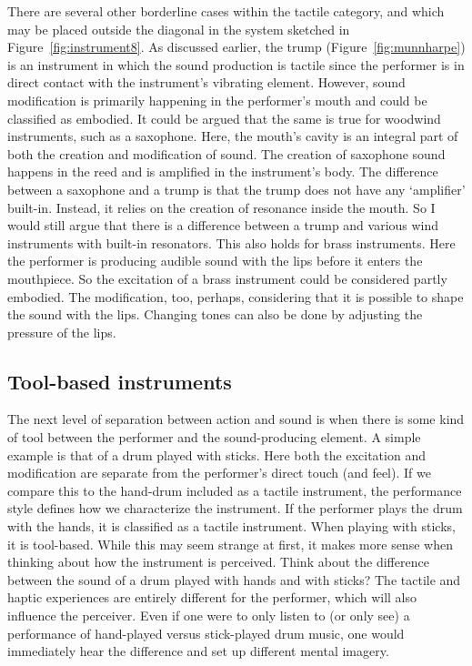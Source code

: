 There are several other borderline cases within the tactile category, and which may be placed outside the diagonal in the system sketched in Figure~\ref{fig:instrument8}. As discussed earlier, the trump (Figure~\ref{fig:munnharpe}) is an instrument in which the sound production is tactile since the performer is in direct contact with the instrument's vibrating element. However, sound modification is primarily happening in the performer's mouth and could be classified as embodied. It could be argued that the same is true for woodwind instruments, such as a saxophone. Here, the mouth's cavity is an integral part of both the creation and modification of sound. The creation of saxophone sound happens in the reed and is amplified in the instrument's body. The difference between a saxophone and a trump is that the trump does not have any `amplifier' built-in. Instead, it relies on the creation of resonance inside the mouth. So I would still argue that there is a difference between a trump and various wind instruments with built-in resonators. This also holds for brass instruments. Here the performer is producing audible sound with the lips before it enters the mouthpiece. So the excitation of a brass instrument could be considered partly embodied. The modification, too, perhaps, considering that it is possible to shape the sound with the lips. Changing tones can also be done by adjusting the pressure of the lips.


\subsection{Tool-based instruments}

The next level of separation between action and sound is when there is some kind of tool between the performer and the sound-producing element. A simple example is that of a drum played with sticks. Here both the excitation and modification are separate from the performer's direct touch (and feel).  If we compare this to the hand-drum included as a tactile instrument, the performance style defines how we characterize the instrument. If the performer plays the drum with the hands, it is classified as a tactile instrument. When playing with sticks, it is tool-based. While this may seem strange at first, it makes more sense when thinking about how the instrument is perceived. Think about the difference between the sound of a drum played with hands and with sticks? The tactile and haptic experiences are entirely different for the performer, which will also influence the perceiver. Even if one were to only listen to (or only see) a performance of hand-played versus stick-played drum music, one would immediately hear the difference and set up different mental imagery.


